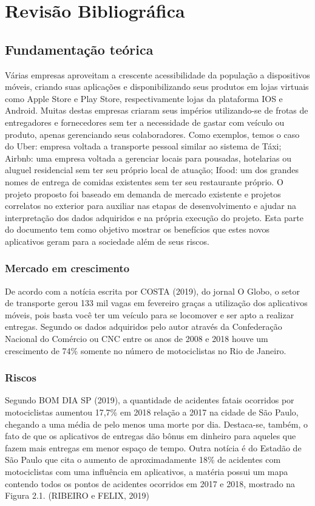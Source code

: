 \chapter{Revisão Bibliográfica} \label{cap:rev}

\section{Fundamentação teórica} 

Várias empresas aproveitam a crescente acessibilidade da população a dispositivos móveis, criando suas aplicações e disponibilizando seus produtos em lojas virtuais como Apple Store e Play Store, respectivamente lojas da plataforma IOS e Android.
Muitas destas empresas criaram seus impérios utilizando-se de frotas de entregadores e fornecedores sem ter a necessidade de gastar com veículo ou produto, apenas gerenciando seus colaboradores. Como exemplos, temos o caso do Uber: empresa voltada a transporte pessoal similar ao sistema de Táxi; Airbnb: uma empresa voltada a gerenciar locais para pousadas, hotelarias ou aluguel residencial sem ter seu próprio local de atuação; Ifood: um dos grandes nomes de entrega de comidas existentes sem ter seu restaurante próprio.
O projeto proposto foi baseado em demanda de mercado existente e projetos correlatos no exterior para auxiliar nas etapas de desenvolvimento e ajudar na interpretação dos dados adquiridos e na própria execução do projeto. Esta parte do documento tem como objetivo mostrar os benefícios que estes novos aplicativos geram para a sociedade além de seus riscos.

\subsection{Mercado em crescimento}
De acordo com a notícia escrita por COSTA (2019), do jornal O Globo, o setor de transporte gerou 133 mil vagas em fevereiro graças a utilização dos aplicativos móveis, pois basta você ter um veículo para se locomover e ser apto a realizar entregas. Segundo os dados adquiridos pelo autor através da Confederação Nacional do Comércio ou CNC entre os anos de 2008 e 2018 houve um crescimento de 74\% somente no número de motociclistas no Rio de Janeiro. 

\subsection{Riscos}

Segundo BOM DIA SP (2019), a quantidade de acidentes fatais ocorridos por motociclistas aumentou 17,7\% em 2018 relação a 2017 na cidade de São Paulo, chegando a uma média de pelo menos uma morte por dia. Destaca-se, também, o fato de que os aplicativos de entregas dão bônus em dinheiro para aqueles que fazem mais entregas em menor espaço de tempo.
Outra notícia é do Estadão de São Paulo que cita o aumento de aproximadamente 18\% de acidentes com motociclistas com uma influência em aplicativos, a matéria possui um mapa contendo todos os pontos de acidentes ocorridos em 2017 e 2018, mostrado na Figura 2.1. (RIBEIRO e FELIX, 2019)


